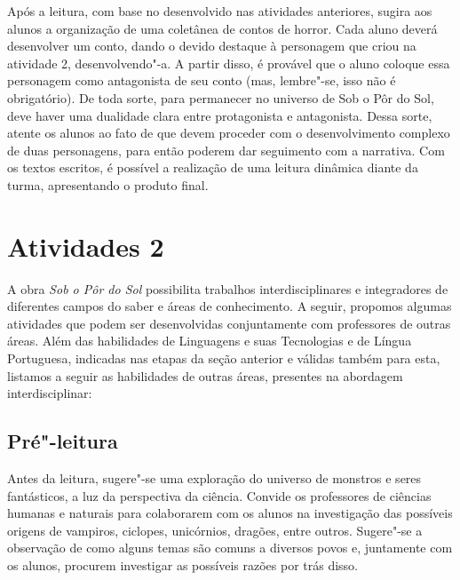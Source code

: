 \documentclass[12pt]{extarticle}
\begin{document}

Após a leitura, com base no desenvolvido nas atividades
anteriores, sugira aos alunos a organização de uma coletânea de contos
de horror. Cada aluno deverá desenvolver um conto, dando o devido
destaque à personagem que criou na atividade 2, desenvolvendo"-a. A
partir disso, é provável que o aluno coloque essa personagem como
antagonista de seu conto (mas, lembre"-se, isso não é obrigatório). De
toda sorte, para permanecer no universo de Sob o Pôr do Sol, deve haver
uma dualidade clara entre protagonista e antagonista. Dessa sorte,
atente os alunos ao fato de que devem proceder com o desenvolvimento
complexo de duas personagens, para então poderem dar seguimento com a
narrativa. Com os textos escritos, é possível a realização de uma
leitura dinâmica diante da turma, apresentando o produto final.


\section{Atividades 2}

A obra \emph{Sob o Pôr do Sol} possibilita trabalhos interdisciplinares
e integradores de diferentes campos do saber e áreas de conhecimento. A
seguir, propomos algumas atividades que podem ser desenvolvidas
conjuntamente com professores de outras áreas. Além das habilidades de
Linguagens e suas Tecnologias e de Língua Portuguesa, indicadas nas
etapas da seção anterior e válidas também para esta, listamos a seguir
as habilidades de outras áreas, presentes na abordagem interdisciplinar:


\subsection{Pré"-leitura}

Antes da leitura, sugere"-se uma exploração do universo de
monstros e seres fantásticos, a luz da perspectiva da ciência. Convide
os professores de ciências humanas e naturais para colaborarem com os
alunos na investigação das possíveis origens de vampiros, ciclopes,
unicórnios, dragões, entre outros. Sugere"-se a observação de como alguns
temas são comuns a diversos povos e, juntamente com os alunos, procurem
investigar as possíveis razões por trás disso.
\end{document}
